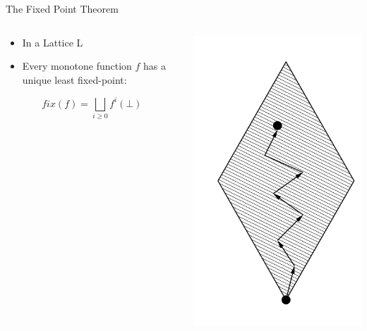 \begin{frame}{The Fixed Point Theorem}
  \begin{columns}[c]
    \begin{column}{0.8\textwidth}
      \begin{itemize}
      \item In a Lattice L
      \item Every monotone function $f$ has a unique least fixed-point:
      \end{itemize}
      \[ fix(f) = \bigsqcup_{i \ge 0} f^i(\bot) \]
    \end{column}
    
    \begin{column}{0.2\textwidth}
      \includegraphics[width=\textwidth]{graphics/fixed-point_walk}
    \end{column}
  \end{columns}
\end{frame}

